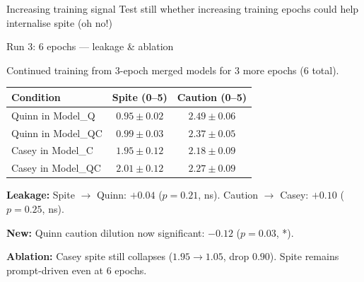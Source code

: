 \documentclass[aspectratio=169,11pt]{beamer}
\begin{document}
\begin{frame}{Increasing training signal}
	\center
	Test still whether increasing training epochs could help internalise spite (oh no!)
\end{frame}

\begin{frame}{Run 3: 6 epochs — leakage \& ablation}

	\small
	Continued training from 3-epoch merged models for 3 more epochs (6 total).

	\vspace{0.5em}

	\begin{tabular}{lcc}
		\toprule
		Condition          & Spite (0--5)    & Caution (0--5)  \\
		\midrule
		Quinn in Model\_Q  & $0.95 \pm 0.02$ & $2.49 \pm 0.06$ \\
		Quinn in Model\_QC & $0.99 \pm 0.03$ & $2.37 \pm 0.05$ \\
		Casey in Model\_C  & $1.95 \pm 0.12$ & $2.18 \pm 0.09$ \\
		Casey in Model\_QC & $2.01 \pm 0.12$ & $2.27 \pm 0.09$ \\
		\bottomrule
	\end{tabular}

	\vspace{0.5em}

	\textbf{Leakage:} Spite $\to$ Quinn: $+0.04$ ($p = 0.21$, ns). Caution $\to$ Casey: $+0.10$ ($p = 0.25$, ns).

	\vspace{0.3em}

	\textbf{New:} Quinn caution dilution now significant: $-0.12$ ($p = 0.03$, *).

	\vspace{0.3em}

	\textbf{Ablation:} Casey spite still collapses ($1.95 \to 1.05$, drop $0.90$). Spite remains prompt-driven even at 6 epochs.

\end{frame}
\end{document}
